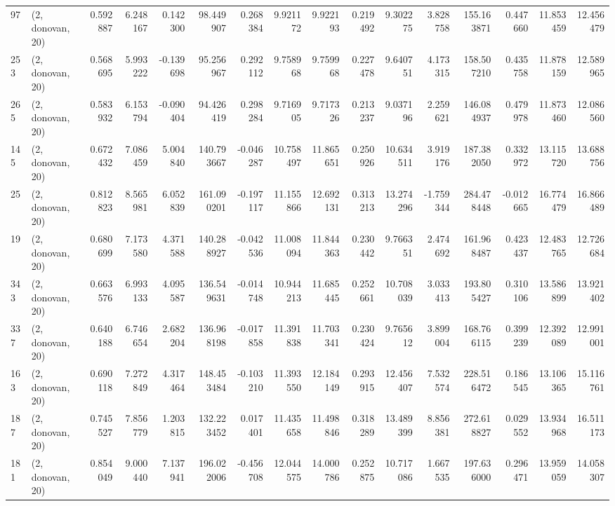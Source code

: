 \begin{tabular}{llrrrrrrrrrrrrrr}
97  &  (2, donovan, 20) &   0.592887 &   6.248167 &   0.142300 &    98.449907 &   0.268384 &   9.921172 &   9.922193 &  0.219492 &   9.302275 &   3.828758 &   155.163871 &  0.447660 &  11.853459 &  12.456479 \\
253 &  (2, donovan, 20) &   0.568695 &   5.993222 &  -0.139698 &    95.256967 &   0.292112 &   9.758968 &   9.759968 &  0.227478 &   9.640751 &   4.173315 &   158.507210 &  0.435758 &  11.878159 &  12.589965 \\
265 &  (2, donovan, 20) &   0.583932 &   6.153794 &  -0.090404 &    94.426419 &   0.298284 &   9.716905 &   9.717326 &  0.213237 &   9.037196 &   2.259621 &   146.084937 &  0.479978 &  11.873460 &  12.086560 \\
145 &  (2, donovan, 20) &   0.672432 &   7.086459 &   5.004840 &   140.793667 &  -0.046287 &  10.758497 &  11.865651 &  0.250926 &  10.634511 &   3.919176 &   187.382050 &  0.332972 &  13.115720 &  13.688756 \\
25  &  (2, donovan, 20) &   0.812823 &   8.565981 &   6.052839 &   161.090201 &  -0.197117 &  11.155866 &  12.692131 &  0.313213 &  13.274296 &  -1.759344 &   284.478448 & -0.012665 &  16.774479 &  16.866489 \\
19  &  (2, donovan, 20) &   0.680699 &   7.173580 &   4.371588 &   140.288927 &  -0.042536 &  11.008094 &  11.844363 &  0.230442 &   9.766351 &   2.474692 &   161.968487 &  0.423437 &  12.483765 &  12.726684 \\
343 &  (2, donovan, 20) &   0.663576 &   6.993133 &   4.095587 &   136.549631 &  -0.014748 &  10.944213 &  11.685445 &  0.252661 &  10.708039 &   3.033413 &   193.805427 &  0.310106 &  13.586899 &  13.921402 \\
337 &  (2, donovan, 20) &   0.640188 &   6.746654 &   2.682204 &   136.968198 &  -0.017858 &  11.391838 &  11.703341 &  0.230424 &   9.765612 &   3.899004 &   168.766115 &  0.399239 &  12.392089 &  12.991001 \\
163 &  (2, donovan, 20) &   0.690118 &   7.272849 &   4.317464 &   148.453484 &  -0.103210 &  11.393550 &  12.184149 &  0.293915 &  12.456407 &   7.532574 &   228.516472 &  0.186545 &  13.106365 &  15.116761 \\
187 &  (2, donovan, 20) &   0.745527 &   7.856779 &   1.203815 &   132.223452 &   0.017401 &  11.435658 &  11.498846 &  0.318289 &  13.489399 &   8.856381 &   272.618827 &  0.029552 &  13.934968 &  16.511173 \\
181 &  (2, donovan, 20) &   0.854049 &   9.000440 &   7.137941 &   196.022006 &  -0.456708 &  12.044575 &  14.000786 &  0.252875 &  10.717086 &   1.667535 &   197.636000 &  0.296471 &  13.959059 &  14.058307 \\

\end{tabular}
